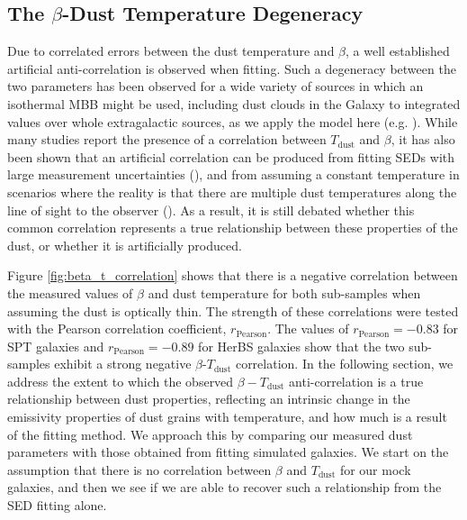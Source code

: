 \subsection{The $\beta$-Dust Temperature Degeneracy}

Due to correlated errors between the dust temperature and $\beta$, a well established artificial anti-correlation is observed when fitting. Such a degeneracy between the two parameters has been observed for a wide variety of sources in which an isothermal MBB might be used, including dust clouds in the Galaxy to integrated values over whole extragalactic sources, as we apply the model here (e.g. \citealt{Dupac_2003, Desert_2008, Paradis_2010, Schnee_2010, Veneziani_2010, Bracco_2011, Galametz_2012, Paladini_2012, Smith_2012, Lamperti_2019, daCunha_2021}). While many studies report the presence of a correlation between $T_\textrm{dust}$ and $\beta$, it has also been shown that an artificial correlation can be produced from fitting SEDs with large measurement uncertainties (\citealt{Shetty_2009a, Kelly_2012, Juvela_2012a}), and from assuming a constant temperature in scenarios where the reality is that there are multiple dust temperatures along the line of sight to the observer (\citealt{Shetty_2009b, Juvela_2012b}). As a result, it is still debated whether this common correlation represents a true relationship between these properties of the dust, or whether it is artificially produced.

Figure \ref{fig:beta_t_correlation} shows that there is a negative correlation between the measured values of $\beta$ and dust temperature for both sub-samples when assuming the dust is optically thin. The strength of these correlations were tested with the Pearson correlation coefficient, $r_{\textrm{Pearson}}$. The values of $r_{\textrm{Pearson}} = -0.83$ for SPT galaxies and $r_{\textrm{Pearson}} = -0.89$ for HerBS galaxies show that the two sub-samples exhibit a strong negative $\beta$-$T_{\textrm{dust}}$ correlation. In the following section, we address the extent to which the observed $\beta-T_{\textrm{dust}}$ anti-correlation is a true relationship between dust properties, reflecting an intrinsic change in the emissivity properties of dust grains with temperature, and how much is a result of the fitting method. We approach this by comparing our measured dust parameters with those obtained from fitting simulated galaxies. We start on the assumption that there is no correlation between $\beta$ and $T_{\textrm{dust}}$ for our mock galaxies, and then we see if we are able to recover such a relationship from the SED fitting alone.

